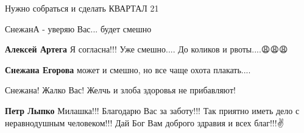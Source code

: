 \begin{itemize}
 

Нужно собраться и сделать КВАРТАЛ 21

СнежанА - уверяю Вас... будет смешно

\begin{itemize}
 
\textbf{Алексей Артега} Я согласна!!!
Уже смешно....
До коликов и рвоты....😩😩😩

 
\textbf{Снежана Егорова} может и смешно, но все чаще охота плакать....

\end{itemize}

 
Снежана! Жалко Вас!
Желчь и злоба здоровья не прибавляют!

\begin{itemize}
 
\textbf{Петр Лыпко} Милашка!!!
Благодарю Вас за заботу!!!
Так приятно иметь дело с неравнодушным человеком!!!
Дай Бог Вам доброго здравия и всех благ!!!✌️

 

\end{itemize}
\end{itemize}
